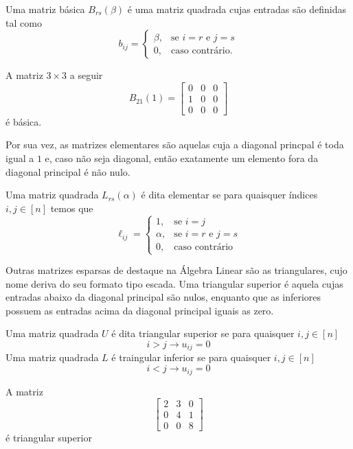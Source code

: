 \begin{def:matriz básica}
Uma matriz básica $B_{rs}(\beta)$ é uma matriz quadrada cujas entradas são definidas tal como
\[
	b_{ij} = \begin{cases}
		\beta, & \text{se } i = r \text{ e } j = s \\
		0,     & \text{caso contrário.}
	\end{cases}
\]
\end{def:matriz básica}

\begin{exp:matriz basica}
A matriz $3 \times 3$ a seguir
\[
	B_{21}(1) = \begin{bmatrix}
		0 & 0 & 0 \\
		1 & 0 & 0 \\
		0 & 0 & 0
	\end{bmatrix}
\]
é básica.
\end{exp:matriz basica}

Por sua vez, as matrizes elementares são aquelas cuja a diagonal princpal é toda igual a
$1$ e, caso não seja diagonal, então exatamente um elemento fora da diagonal principal
é não nulo.

\begin{def:matriz elementar}
Uma matriz quadrada $L_{rs}(\alpha)$ é dita elementar se para quaisquer índices $i, j \in [n]$
temos que
\[
	\ell_{ij} = \begin{cases}
		1,      & \text{se } i = j                  \\
		\alpha, & \text{se } i = r \text{ e } j = s \\
		0,      & \text{caso contrário}
	\end{cases}
\]
\end{def:matriz elementar}

Outras matrizes esparsas de destaque na Álgebra Linear são as triangulares, cujo nome
deriva do seu formato tipo escada.
Uma triangular superior é aquela cujas entradas abaixo da diagonal principal são nulos,
enquanto que as inferiores possuem as entradas acima da diagonal principal iguais as zero.

\begin{def:matriz triangular}
Uma matriz quadrada $U$ é dita triangular superior se para quaisquer $i, j \in [n]$
\[
	i > j \rightarrow u_{ij} = 0
\]
Uma matriz quadrada $L$ é traingular inferior se para quaisquer $i, j \in [n]$
\[
	i < j \rightarrow u_{ij} = 0
\]
\end{def:matriz triangular}

\begin{exp:triangular1}
A matriz
\[
	\begin{bmatrix}
		2 & 3 & 0 \\
		0 & 4 & 1 \\
		0 & 0 & 8
	\end{bmatrix}
\]
é triangular superior
\end{exp:triangular1}

